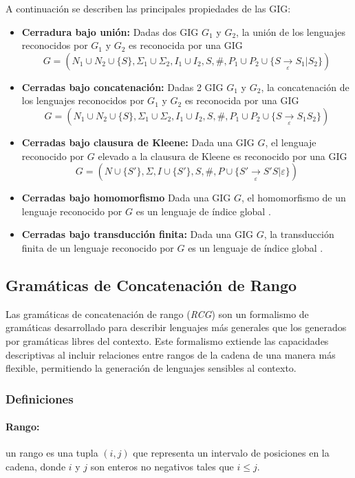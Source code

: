\documentclass{article}
\begin{document}
A continuación se describen las principales propiedades de las GIG:
\begin{itemize}
      \item \textbf{Cerradura bajo unión:} Dadas dos GIG $G_1$ y $G_2$, la unión de los lenguajes reconocidos por $G_1$ y $G_2$ es reconocida por una GIG
            $$G=(N_1\cup N_2\cup \{S\},\Sigma_1\cup \Sigma_2,I_1\cup I_2,S,\#,P_1\cup P_2\cup \{S \underset{\varepsilon}{\to} S_1|S_2\})$$
      \item \textbf{Cerradas bajo concatenación:} Dadas 2 GIG $G_1$ y $G_2$, la concatenación de los lenguajes reconocidos por $G_1$ y $G_2$ es reconocida por una GIG
            $$G=(N_1\cup N_2\cup \{S\},\Sigma_1\cup \Sigma_2,I_1\cup I_2,S,\#,P_1\cup P_2\cup \{S \underset{\varepsilon}{\to} S_1S_2\})$$
      \item \textbf{Cerradas bajo clausura de Kleene:} Dada una GIG $G$, el lenguaje reconocido por $G$ elevado a la clausura de Kleene es reconocido por una GIG
            $$G=(N\cup \{S'\},\Sigma,I\cup \{S'\},S,\#,P\cup \{S'\underset{\varepsilon}{\to} S'S|\varepsilon\})$$
      \item  \textbf{Cerradas bajo homomorfismo} Dada una GIG $G$, el homomorfismo de un lenguaje reconocido por $G$ es un lenguaje de índice global \cite{globalIndexLanguages}.
      \item  \textbf{Cerradas bajo transducción finita:} Dada una GIG $G$, la transducción finita de un lenguaje reconocido por $G$ es un lenguaje de índice global \cite{globalIndexLanguages}.
\end{itemize}

\subsection{Gramáticas de Concatenación de Rango}

Las gramáticas de concatenación de rango (\textit{RCG}) \cite{mainRCGBib} son un formalismo de gramáticas desarrollado para describir lenguajes más generales que los generados por gramáticas libres del contexto.
Este formalismo extiende las capacidades descriptivas al incluir relaciones entre rangos de la cadena de una manera más flexible,
permitiendo la generación de lenguajes sensibles al contexto.

\subsubsection{Definiciones}

\paragraph{Rango:} un rango es una tupla $(i, j)$ que representa un intervalo de posiciones en la cadena, donde $i$ y $j$ son enteros no negativos tales que $i \leq j$.
\end{document}
